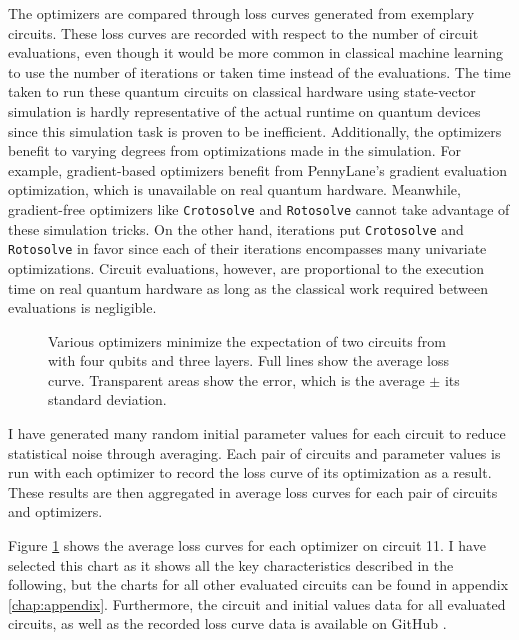 The optimizers are compared through loss curves generated from exemplary
circuits.
These loss curves are recorded with respect to the number of circuit
evaluations, even though it would be more common in classical machine learning
to use the number of iterations or taken time instead of the evaluations.
The time taken to run these quantum circuits on classical hardware using
state-vector simulation is hardly representative of the actual runtime on
quantum devices since this simulation task is proven to be inefficient.
Additionally, the optimizers benefit to varying degrees from optimizations made
in the simulation.
For example, gradient-based optimizers benefit from PennyLane's gradient
evaluation optimization, which is unavailable on real quantum hardware.
Meanwhile, gradient-free optimizers like \texttt{Crotosolve} and
\texttt{Rotosolve} cannot take advantage of these simulation tricks.
On the other hand, iterations put \texttt{Crotosolve} and \texttt{Rotosolve} in
favor since each of their iterations encompasses many univariate optimizations.
Circuit evaluations, however, are proportional to the execution time on real
quantum hardware as long as the classical work required between evaluations is
negligible.

\begin{figure}
    \label{fig:avg-loss-curve}
    \centering
    \caption{Various optimizers minimize the expectation of two circuits from
        \cite{sim_expressibility_2019} with four qubits and three layers.
        Full lines show the average loss curve.
        Transparent areas show the error, which is the average $\pm$ its
        standard deviation.}
\end{figure}

I have generated many random initial parameter values for each circuit to
reduce statistical noise through averaging.
Each pair of circuits and parameter values is run with each optimizer to
record the loss curve of its optimization as a result.
These results are then aggregated in average loss curves for each pair of
circuits and optimizers.

Figure \ref{fig:avg-loss-curve} shows the average loss curves for each
optimizer on circuit 11.
I have selected this chart as it shows all the key characteristics described in
the following, but the charts for all other evaluated circuits can be found in
appendix \ref{chap:appendix}.
Furthermore, the circuit and initial values data for all evaluated circuits, as
well as the recorded loss curve data is available on GitHub \cite{crotosolve}.

